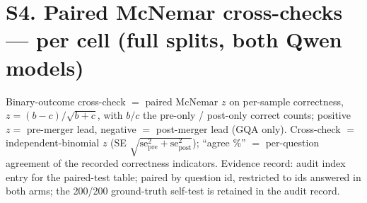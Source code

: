 \documentclass[journal]{IEEEtran}
\begin{document}
\section*{S4. Paired McNemar cross-checks --- per cell (full splits, both Qwen models)}

Binary-outcome cross-check $=$ paired McNemar $z$ on per-sample correctness,
$z = (b - c)/\sqrt{b + c}$, with $b/c$ the pre-only / post-only correct counts;
positive $z =$ pre-merger lead, negative $=$ post-merger lead (GQA only).
Cross-check $=$ independent-binomial $z$ (SE $\sqrt{\mathrm{se}^2_{\mathrm{pre}}
+ \mathrm{se}^2_{\mathrm{post}}}$); ``agree \%'' $=$ per-question agreement of
the recorded correctness indicators. Evidence record: audit index
entry for the paired-test table; paired by question id, restricted to ids answered
in both arms; the 200/200 ground-truth self-test is retained in the audit record.
\end{document}
